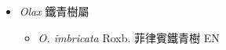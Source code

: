 
  \begin{itemize}
 \item[] \textit{Olax} 鐵青樹屬
                                
  \begin{itemize}
        \item[] \textit{O. imbricata} Roxb.  菲律賓鐵青樹   EN
  \end{itemize}
  \end{itemize}
